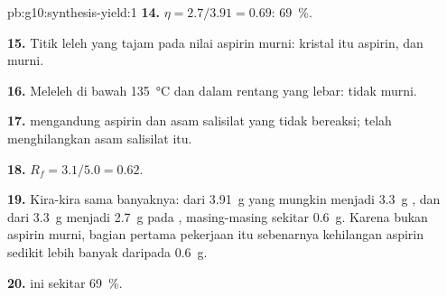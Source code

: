 \begin{solution}{pb:g10:synthesis-yield:1}
\textbf{14.} $\eta = 2.7 / 3.91 = 0.69$: \qty{69}{\percent}.

\textbf{15.} Titik leleh yang tajam pada nilai aspirin murni: kristal
itu aspirin, dan murni.

\textbf{16.} Meleleh di bawah \qty{135}{\celsius} dan dalam rentang yang
lebar:  tidak murni.

\textbf{17.}  mengandung aspirin dan asam salisilat yang
tidak bereaksi;  telah menghilangkan asam salisilat itu.

\textbf{18.} $R_f = 3.1 / 5.0 = 0.62$.

\textbf{19.} Kira-kira sama banyaknya: dari \qty{3.91}{g} yang mungkin
menjadi \qty{3.3}{g} , dan dari \qty{3.3}{g} menjadi
\qty{2.7}{g} pada , masing-masing sekitar \qty{0.6}{g}.
Karena  bukan aspirin murni, bagian pertama pekerjaan itu
sebenarnya kehilangan aspirin sedikit lebih banyak daripada
\qty{0.6}{g}.

\textbf{20.}   ini sekitar \qty{69}{\percent}.
\end{solution}
